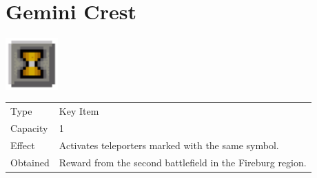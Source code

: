 \section{Gemini Crest}
\label{item:gemini_crest}

\includegraphics[height=2cm,keepaspectratio]{./resources/items/geminicrest}

\begin{longtable}{ l p{9cm} }
	Type
	& Key Item
\\ %
	Capacity
	& 1
\\ %
	Effect
	& Activates teleporters marked with the same symbol.
\\ %
	Obtained
	& Reward from the second battlefield in the Fireburg region.
\end{longtable}
